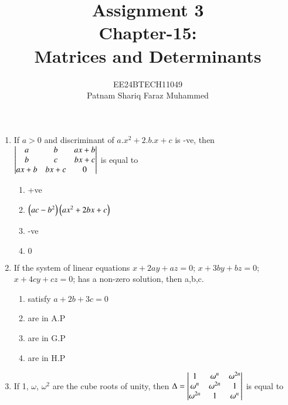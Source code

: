 \documentclass[journal,12pt,twocolumn]{IEEEtran}
\theoremstyle{remark}
\begin{document}


\title{Assignment 3 \\ Chapter-15: \\ Matrices and Determinants}
\author{EE24BTECH11049 \\ Patnam Shariq Faraz Muhammed}

\maketitle
\newpage
\bigskip

\begin{enumerate}

\item
	If $a>0$ and discriminant of $a.x^{2}+2.b.x+c$ is -ve, then
	$\begin{vmatrix}a & b & ax+b \\ b & c & bx+c \\ ax+b & bx+c & 0\end{vmatrix}$ is equal to 
	
	\hfill{}	

	\begin{enumerate}[label=(\alph*)]
		\item +ve
		\item $\left(ac-b^2\right)\left(ax^2+2bx+c\right)$
		\item -ve
		\item $0$
	\end{enumerate}

\item
	If the system of linear equations $x+2ay+az = 0$; $x+3by+bz = 0$; $x+4cy+cz = 0$; has a non-zero solution, then a,b,c.

	\hfill{}

	\begin{enumerate}[label=(\alph*)]
                \item satisfy $a+ 2b+3c = 0$
                \item are in A.P
                \item are in G.P
                \item are in H.P
        \end{enumerate} 	

\item                    
	If 1, $\omega$, $\omega^{2}$ are the cube roots of unity, then
	$\Delta = \begin{vmatrix}1 & \omega^{n} & \omega^{2n} \\ \omega^{n} & \omega^{2n} & 1 \\ \omega^{2n} & 1 & \omega^{n}\end{vmatrix}$ is equal to 
        

\end{enumerate}
\end{document}
